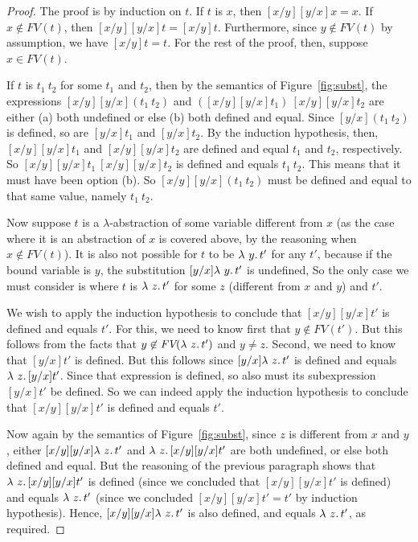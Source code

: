 \begin{proof}
  The proof is by induction on $t$.  If $t$ is $x$, then $[x/y][y/x]x = x$.  If $x\not\in\textit{FV}(t)$,
  then $[x/y][y/x]t = [x/y]t$.  Furthermore, since $y\not\in\textit{FV}(t)$ by assumption, we have $[x/y]t = t$.
  For the rest of the proof, then, suppose $x\in\textit{FV}(t)$.

  If $t$ is $t_1\ t_2$ for some $t_1$ and $t_2$, then by the semantics of Figure~\ref{fig:subst},
  the expressions $[x/y][y/x](t_1\ t_2)$ and $([x/y][y/x]t_1)\ [x/y][y/x]t_2$ are either (a) both undefined
  or else (b) both defined and equal. Since $[y/x](t_1\ t_2)$ is defined, so are $[y/x]t_1$ and $[y/x]t_2$.
  By the induction hypothesis, then, $[x/y][y/x]t_1$ and
  $[x/y][y/x]t_2$ are defined and equal $t_1$ and $t_2$, respectively.  So $[x/y][y/x]t_1\ [x/y][y/x]t_2$ is defined and
  equals $t_1\ t_2$.  This means that it must have
  been option (b).  So $[x/y][y/x](t_1\ t_2)$ must be defined and equal to that same value, namely $t_1\ t_2$.

  Now suppose $t$ is a $\lambda$-abstraction of some variable different from $x$ (as the
  case where it is an abstraction of $x$ is covered above, by the reasoning when $x\not\in\textit{FV}(t)$).
  It is also not possible for $t$ to be $\lambda\ y.\, t'$ for any $t'$, because if the bound variable is $y$, the substitution
  $[y/x]\lambda\ y.\, t'$ is undefined, 
  So the only case we must consider is where $t$ is $\lambda\ z.\, t'$ for some $z$ (different from $x$ and $y$) and $t'$.

  We wish to apply the induction hypothesis to conclude that $[x/y][y/x]t'$ is defined and equals $t'$.  For this,
  we need to know first that $y\not\in\textit{FV}(t')$.  But this follows from the facts that $y\not\in\textit{FV}(\lambda\ z.\, t')$
  and $y \neq z$.  Second, we need to know that $[y/x]t'$ is defined.  But this follows since $[y/x]\lambda\ z.\, t'$ is
  defined and equals $\lambda\ z.\, [y/x]t'$.  Since that expression is defined, so also
  must its subexpression $[y/x]t'$ be defined.  So we can indeed apply the induction hypothesis to conclude
  that $[x/y][y/x]t'$ is defined and equals $t'$.

  Now again by the semantics of Figure~\ref{fig:subst}, since $z$ is different from $x$ and $y$, either $[x/y][y/x]\lambda\ z.\, t'$
  and $\lambda\ z.\, [x/y][y/x]t'$ are both undefined, or else both defined and equal.  But the reasoning of the previous
  paragraph shows that $\lambda\ z.\, [x/y][y/x]t'$ is defined (since we concluded that $[x/y][y/x]t'$ is defined)
  and equals $\lambda\ z.\, t'$ (since we concluded $[x/y][y/x]t' = t'$ by induction hypothesis).  Hence, $[x/y][y/x]\lambda\ z.\, t'$
  is also defined, and equals $\lambda\ z.\, t'$, as required.
\end{proof}

